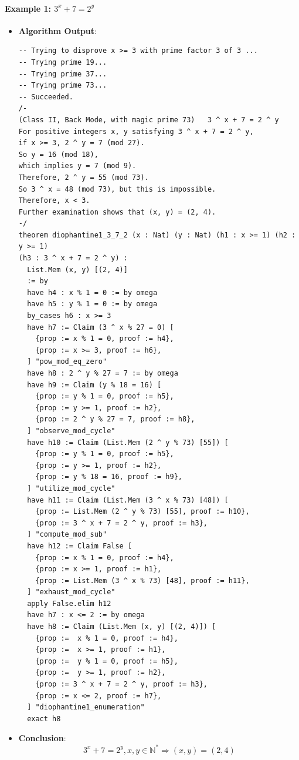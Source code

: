 \documentclass{article}
\begin{document}
\paragraph{Example 1: $3^x+7=2^y$}
\begin{itemize}
\item \textbf{Algorithm Output}:
    \begin{verbatim}
-- Trying to disprove x >= 3 with prime factor 3 of 3 ...
-- Trying prime 19...
-- Trying prime 37...
-- Trying prime 73...
-- Succeeded.
/-
(Class II, Back Mode, with magic prime 73)   3 ^ x + 7 = 2 ^ y
For positive integers x, y satisfying 3 ^ x + 7 = 2 ^ y,
if x >= 3, 2 ^ y = 7 (mod 27).
So y = 16 (mod 18),
which implies y = 7 (mod 9).
Therefore, 2 ^ y = 55 (mod 73).
So 3 ^ x = 48 (mod 73), but this is impossible.
Therefore, x < 3.
Further examination shows that (x, y) = (2, 4).
-/
theorem diophantine1_3_7_2 (x : Nat) (y : Nat) (h1 : x >= 1) (h2 : y >= 1) 
(h3 : 3 ^ x + 7 = 2 ^ y) :      
  List.Mem (x, y) [(2, 4)]
  := by
  have h4 : x % 1 = 0 := by omega
  have h5 : y % 1 = 0 := by omega
  by_cases h6 : x >= 3
  have h7 := Claim (3 ^ x % 27 = 0) [
    {prop := x % 1 = 0, proof := h4},
    {prop := x >= 3, proof := h6},
  ] "pow_mod_eq_zero"
  have h8 : 2 ^ y % 27 = 7 := by omega
  have h9 := Claim (y % 18 = 16) [
    {prop := y % 1 = 0, proof := h5},
    {prop := y >= 1, proof := h2},
    {prop := 2 ^ y % 27 = 7, proof := h8},
  ] "observe_mod_cycle"
  have h10 := Claim (List.Mem (2 ^ y % 73) [55]) [
    {prop := y % 1 = 0, proof := h5},
    {prop := y >= 1, proof := h2},
    {prop := y % 18 = 16, proof := h9},
  ] "utilize_mod_cycle"
  have h11 := Claim (List.Mem (3 ^ x % 73) [48]) [
    {prop := List.Mem (2 ^ y % 73) [55], proof := h10},
    {prop := 3 ^ x + 7 = 2 ^ y, proof := h3},
  ] "compute_mod_sub"
  have h12 := Claim False [
    {prop := x % 1 = 0, proof := h4},
    {prop := x >= 1, proof := h1},
    {prop := List.Mem (3 ^ x % 73) [48], proof := h11},
  ] "exhaust_mod_cycle"
  apply False.elim h12
  have h7 : x <= 2 := by omega
  have h8 := Claim (List.Mem (x, y) [(2, 4)]) [
    {prop :=  x % 1 = 0, proof := h4},
    {prop :=  x >= 1, proof := h1},
    {prop :=  y % 1 = 0, proof := h5},
    {prop :=  y >= 1, proof := h2},
    {prop := 3 ^ x + 7 = 2 ^ y, proof := h3},
    {prop := x <= 2, proof := h7},
  ] "diophantine1_enumeration"
  exact h8
    \end{verbatim}
    \item \textbf{Conclusion}:
    \[ 3^x+7=2^y, x, y \in \mathbb{N}^* \Rightarrow (x,y)=(2,4) \]
\end{itemize}
\end{document}
